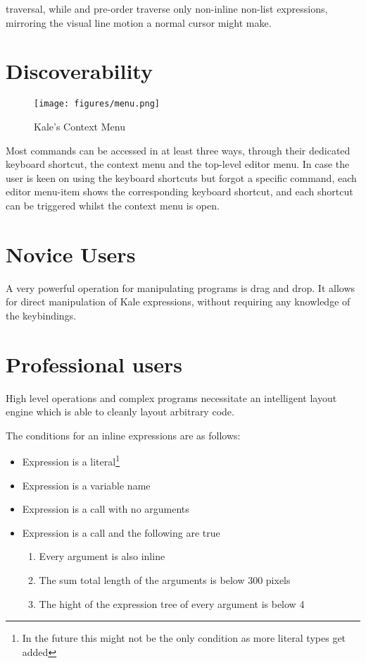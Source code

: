 \documentclass[11pt]{report}
\begin{document}
traversal, while \ak{^} and 
pre-order traverse only non-inline non-list expressions, mirroring the visual
line motion a normal cursor might make.

\section{Discoverability}
\setlength\intextsep{0pt}
\begin{wrapfigure}{R}{0pt}
\vspace{-22pt}
\texttt{[image: figures/menu.png]}
\caption{Kale's Context Menu}
\end{wrapfigure}
Most commands can be accessed in at least three ways, through their dedicated
keyboard shortcut, the context menu and the top-level editor menu. In case the
user is keen on using the keyboard shortcuts but forgot a specific command,
each editor menu-item shows the corresponding keyboard shortcut, and each
shortcut can be triggered whilst the context menu is open.

\section{Novice Users}
A very powerful operation for manipulating programs is drag and drop. It allows
for direct manipulation of Kale expressions, without requiring any knowledge of
the keybindings.

\section{Professional users}


High level operations and complex programs necessitate an intelligent layout
engine which is able to cleanly layout arbitrary code.

The conditions for an inline expressions are as follows:

\begin{itemize}
	\item Expression is a literal\footnote{In the future this might not be the
only condition as more literal types get added}
	\item Expression is a variable name
	\item Expression is a call with no arguments
	\item Expression is a call and the following are true
	\begin{enumerate}
		\item Every argument is also inline
		\item The sum total length of the arguments is below 300 pixels
		\item The hight of the expression tree of every argument is below 4
	\end{enumerate}
\end{itemize}
\end{document}
